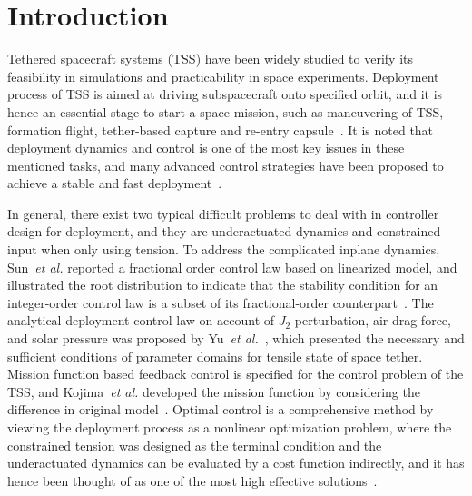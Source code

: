 \documentclass[ShortAfour]{sage}
\theoremstyle{plain}
\theoremstyle{remark}
\begin{document}


\section{Introduction}

Tethered spacecraft systems (TSS) have been widely studied to verify its feasibility in simulations and practicability in space experiments. Deployment process of TSS is aimed at driving subspacecraft onto specified orbit, and it is hence an essential stage to start a space mission, such as maneuvering of TSS, formation flight, tether-based capture and re-entry capsule~\cite{huang_wang_meng_liu_2015,Williams2009745,Steindl2016,mantellato2017simulation,ASLANOV2017180}. 
It is noted that deployment dynamics and control is one of the most key issues in these mentioned tasks, and many advanced control strategies have been proposed to achieve a stable and fast deployment~\cite{wen2016constrained,Ma2017Pure}. 

In general, there exist two typical difficult problems to deal with in controller design for deployment, and they are underactuated dynamics and constrained input when only using tension.
To address the complicated inplane dynamics, Sun~{\it et al.} reported a fractional order control law based on linearized model, and illustrated the root distribution to indicate that the stability condition for an integer-order control law is a subset of its fractional-order counterpart~\cite{sun2014fractional,sun2014fractional-order}. 
The analytical deployment control law on account of $J_2$ perturbation, air drag force, and solar pressure was proposed by Yu~{\it et al.}~\cite{yu2017analytical}, which presented the necessary and sufficient conditions of parameter domains for tensile state of space tether.
Mission function based feedback control is specified for the control problem of the TSS, and Kojima~{\it et al.} developed the mission function by considering the difference in original model~\cite{kojima2015mission}. 
Optimal control is a comprehensive method by viewing the deployment process as a nonlinear optimization problem, where the constrained tension was designed as the terminal condition and the underactuated dynamics can be evaluated by a cost function indirectly, and it has hence been thought of as one of the most high effective solutions~\cite{wen2015space}. 
\end{document}
